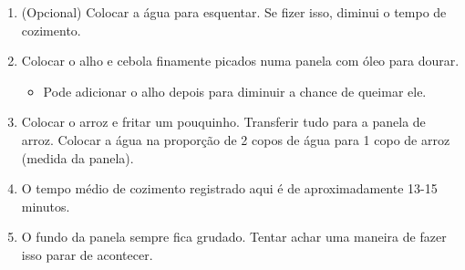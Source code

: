 {
	\begin{enumerate}
		\item (Opcional) Colocar a água para esquentar. Se fizer isso, diminui o
		      tempo de cozimento.
		\item Colocar o alho e cebola finamente picados numa panela com óleo para
		      dourar.
		      \begin{itemize}
			      \item Pode adicionar o alho depois para diminuir a
			            chance de queimar ele.
		      \end{itemize}
		\item Colocar o arroz e fritar um pouquinho. Transferir tudo para a panela de
		      arroz. Colocar a água na proporção de 2 copos de água para 1 copo de arroz
		      (medida da panela).
		\item O tempo médio de cozimento registrado aqui é de aproximadamente 13-15
		      minutos.
		\item O fundo da panela sempre fica grudado. Tentar achar uma maneira de
		      fazer isso parar de acontecer.
	\end{enumerate}
}
